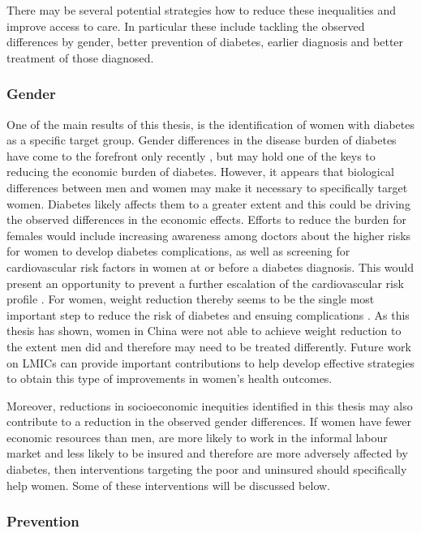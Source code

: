 There may be several potential strategies how to reduce these inequalities and improve access to care. In particular these include tackling the observed differences by gender, better prevention of diabetes, earlier diagnosis and better treatment of those diagnosed.

\subsubsection{Gender}

One of the main results of this thesis, is the identification of women with diabetes as a specific target group. Gender differences in the disease burden of diabetes have come to the forefront only recently \parencite{Peters2015}, but may hold one of the keys to reducing the economic burden of diabetes. However, it appears that biological differences between men and women may make it necessary to specifically target women. Diabetes likely affects them to a greater extent \parencite{Peters2015,Peters2014a,Peters2014,Bertram2010} and this could be driving the observed differences in the economic effects. Efforts to reduce the burden for females would include increasing awareness among doctors about the higher risks for women to develop diabetes complications, as well as screening for cardiovascular risk factors in women at or before a diabetes diagnosis. This would present an opportunity to prevent a further escalation of the cardiovascular risk profile \parencite{Peters2015}. For women, weight reduction thereby seems to be the single most important step to reduce the risk of diabetes and ensuing complications \parencite{Peters2015}. As this thesis has shown, women in China were not able to achieve weight reduction to the extent men did and therefore may need to be treated differently. Future work on \acp{LMIC} can provide important contributions to help develop effective strategies to obtain this type of improvements in women's health outcomes.

Moreover, reductions in socioeconomic inequities identified in this thesis may also contribute to a reduction in the observed gender differences. If women have fewer economic resources than men, are more likely to work in the informal labour market and less likely to be insured \parencite{Galli2008} and therefore are more adversely affected by diabetes, then interventions targeting the poor and uninsured should specifically help women. Some of these interventions will be discussed below.

\subsubsection{Prevention}

